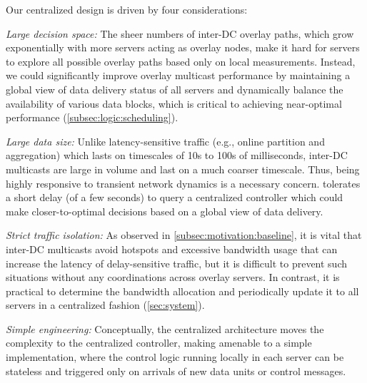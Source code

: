 Our centralized design is driven by four considerations:
\begin{packedenumerate}

\item {\em Large decision space:}
The sheer numbers of inter-DC overlay paths,
which grow exponentially with more servers acting as overlay nodes,
make it hard for servers to explore all possible overlay
paths based only on local measurements.
Instead, we could significantly improve overlay multicast
performance by maintaining a global view of data delivery
status of all servers and dynamically balance
the availability of
various data blocks, which
is critical to achieving near-optimal performance
(\Section\ref{subsec:logic:scheduling}).

\item {\em Large data size:}
Unlike latency-sensitive traffic
(e.g., online partition and aggregation) which lasts on timescales
of 10s to 100s of milliseconds, inter-DC multicasts are large in volume and
last on a much coarser timescale.
Thus, being highly responsive to transient network dynamics is a necessary concern.
\name tolerates a short delay (of a few seconds) to query a centralized controller
which could make closer-to-optimal decisions based on a global view of data delivery.

\item {\em Strict traffic isolation:}
As observed in \Section\ref{subsec:motivation:baseline},
it is vital that inter-DC
multicasts avoid hotspots and excessive bandwidth usage that can increase the latency of delay-sensitive traffic,
but it is difficult to prevent such situations
without any coordinations across overlay servers.
In contrast, it is practical
to determine the bandwidth allocation and periodically update it
to all servers in a centralized fashion (\Section\ref{sec:system}).

\item {\em Simple engineering:}
Conceptually, the centralized architecture moves the complexity to
the centralized controller, making \name amenable to a simple implementation,
where the control logic running locally in each server can be stateless and
triggered only on arrivals of new data units or control messages.

\end{packedenumerate}

